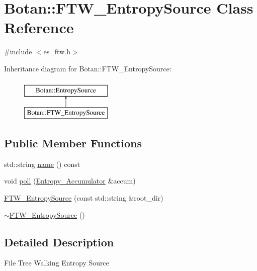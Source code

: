\hypertarget{classBotan_1_1FTW__EntropySource}{\section{Botan\-:\-:F\-T\-W\-\_\-\-Entropy\-Source Class Reference}
\label{classBotan_1_1FTW__EntropySource}
}


{\ttfamily \#include $<$es\-\_\-ftw.\-h$>$}

Inheritance diagram for Botan\-:\-:F\-T\-W\-\_\-\-Entropy\-Source\-:\begin{figure}[H]
\begin{center}
\leavevmode
\includegraphics[height=2.000000cm]{classBotan_1_1FTW__EntropySource}
\end{center}
\end{figure}
\subsection*{Public Member Functions}
\begin{DoxyCompactItemize}
\item 
std\-::string \hyperlink{classBotan_1_1FTW__EntropySource_ab198a491ee74f9351b32bc1ef49c2ace}{name} () const 
\item 
void \hyperlink{classBotan_1_1FTW__EntropySource_a57f39214376a724599ae42b6180a4a04}{poll} (\hyperlink{classBotan_1_1Entropy__Accumulator}{Entropy\-\_\-\-Accumulator} \&accum)
\item 
\hyperlink{classBotan_1_1FTW__EntropySource_af3b4f61a19cd665a735b761ee4a6eb8f}{F\-T\-W\-\_\-\-Entropy\-Source} (const std\-::string \&root\-\_\-dir)
\item 
\hyperlink{classBotan_1_1FTW__EntropySource_a712fb0d59223005305fad6fbecc2fadd}{$\sim$\-F\-T\-W\-\_\-\-Entropy\-Source} ()
\end{DoxyCompactItemize}


\subsection{Detailed Description}
File Tree Walking Entropy Source 


